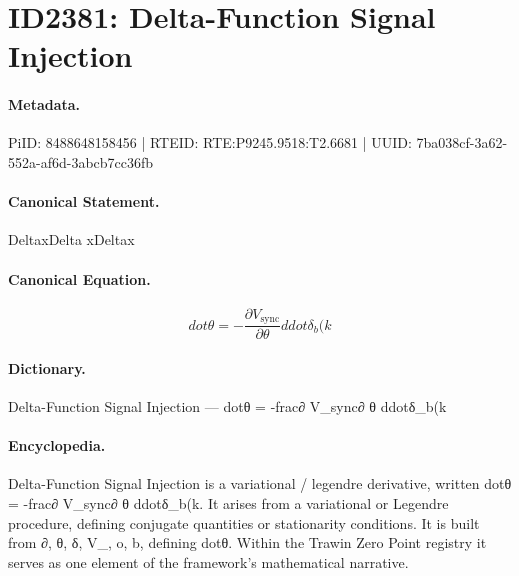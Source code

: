 \section*{ID2381: Delta-Function Signal Injection}
\paragraph{Metadata.}
PiID: 8488648158456 | RTEID: RTE:P9245.9518:T2.6681 | UUID: 7ba038cf-3a62-552a-af6d-3abcb7cc36fb

\paragraph{Canonical Statement.}
DeltaxDelta xDeltax

\paragraph{Canonical Equation.}
\[
dot\theta = -\frac{\partial V_{\text{sync}}}{\partial \theta} ddot{\delta}_b(k
\]

\paragraph{Dictionary.}
Delta-Function Signal Injection — dotθ = -frac∂ V\_sync∂ θ ddotδ\_b(k

\paragraph{Encyclopedia.}
Delta-Function Signal Injection is a variational / legendre derivative, written dotθ = -frac∂ V\_sync∂ θ ddotδ\_b(k. It arises from a variational or Legendre procedure, defining conjugate quantities or stationarity conditions. It is built from ∂, θ, δ, V\_, o, b, defining dotθ. Within the Trawin Zero Point registry it serves as one element of the framework's mathematical narrative.
